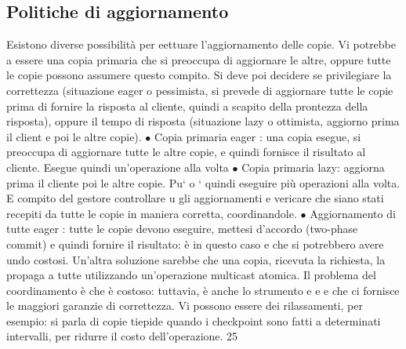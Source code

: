 \documentclass[a4paper,12pt]{article}
\begin{document}
\subsection{Politiche di aggiornamento}
Esistono diverse possibilità per eettuare l'aggiornamento delle copie. Vi potrebbe
a
essere una copia primaria che si preoccupa di aggiornare le altre, oppure tutte
le copie possono assumere questo compito. Si deve poi decidere se privilegiare
la correttezza (situazione eager o pessimista, si prevede di aggiornare tutte le
copie prima di fornire la risposta al cliente, quindi a scapito della prontezza della risposta), oppure il tempo di
risposta (situazione lazy o ottimista, aggiorno
prima il client e poi le altre copie).
$\bullet$ Copia primaria eager : una copia esegue, si preoccupa di aggiornare tutte
le altre copie, e quindi fornisce il risultato al cliente. Esegue quindi
un'operazione alla volta
$\bullet$ Copia primaria lazy: aggiorna prima il cliente poi le altre copie. Pu`
o
`
quindi eseguire più operazioni alla volta. E compito del gestore controllare
u
gli aggiornamenti e vericare che siano stati recepiti da tutte le copie in
maniera corretta, coordinandole.
$\bullet$ Aggiornamento di tutte eager : tutte le copie devono eseguire, mettesi d'accordo (two-phase commit) e quindi
fornire il risultato: è in questo caso
e
che si potrebbero avere undo costosi. Un'altra soluzione sarebbe che una
copia, ricevuta la richiesta, la propaga a tutte utilizzando un'operazione
multicast atomica.
Il problema del coordinamento è che è costoso: tuttavia, è anche lo strumento
e
e
e
che ci fornisce le maggiori garanzie di correttezza. Vi possono essere dei rilassamenti, per esempio: si parla di copie
tiepide quando i checkpoint sono fatti a
determinati intervalli, per ridurre il costo dell'operazione.
25
\end{document}
